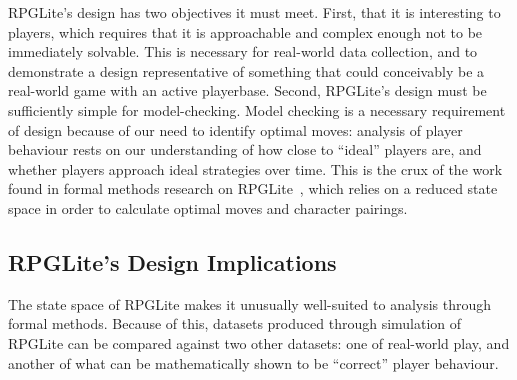 RPGLite's design has two objectives it must meet. First, that it is interesting
to players, which requires that it is approachable and complex enough not to be
immediately solvable. This is necessary for real-world data collection, and to
demonstrate a design representative of something that could conceivably be a
real-world game with an active playerbase. Second, RPGLite's design must be
sufficiently simple for model-checking. Model checking is a necessary
requirement of design because of our need to identify optimal moves: analysis of
player behaviour rests on our understanding of how close to ``ideal'' players
are, and whether players approach ideal strategies over time. This is the crux
of the work found in formal methods research on
RPGLite~\cite{kavanagh2021thesis,kavanagh2020}, which relies on a reduced state
space in order to calculate optimal moves and character pairings.

\subsection{RPGLite's Design Implications}

The state space of RPGLite makes it unusually well-suited to analysis through
formal methods.  Because of this, datasets produced through simulation of
RPGLite can be compared against two other datasets: one of real-world play, and
another of what can be mathematically shown to be ``correct'' player behaviour.

